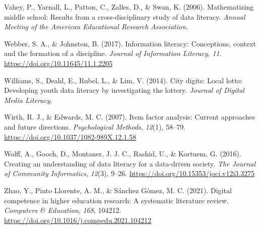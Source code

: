 \documentclass[
  12pt,
  a4paper,
  twoside]{article}
\newlength{\cslhangindent}
\newenvironment{CSLReferences}[2] %
 {\begin{list}{}{%
  \setlength{\itemindent}{0pt}
  \setlength{\leftmargin}{0pt}
  \setlength{\parsep}{0pt}
  \ifodd #1
   \setlength{\leftmargin}{\cslhangindent}
   \setlength{\itemindent}{-1\cslhangindent}
  \fi
  \setlength{\itemsep}{#2\baselineskip}}}
 {\end{list}}
\begin{document}
\begin{CSLReferences}{1}{0}
Vahey, P., Yarnall, L., Patton, C., Zalles, D., \& Swan, K. (2006). Mathematizing middle school: Results from a cross-disciplinary study of data literacy. \emph{Annual Meeting of the American Educational Research Association}.

Webber, S. A., \& Johnston, B. (2017). Information literacy: Conceptions, context and the formation of a discipline. \emph{Journal of Information Literacy}, \emph{11}. \url{https://doi.org/10.11645/11.1.2205}

Williams, S., Deahl, E., Rubel, L., \& Lim, V. (2014). City digits: Local lotto: Developing youth data literacy by investigating the lottery. \emph{Journal of Digital Media Literacy}.

Wirth, R. J., \& Edwards, M. C. (2007). Item factor analysis: Current approaches and future directions. \emph{Psychological Methods}, \emph{12}(1), 58--79. \url{https://doi.org/10.1037/1082-989X.12.1.58}

Wolff, A., Gooch, D., Montaner, J. J. C., Rashid, U., \& Kortuem, G. (2016). Creating an understanding of data literacy for a data-driven society. \emph{The Journal of Community Informatics}, \emph{12}(3), 9--26. \url{https://doi.org/10.15353/joci.v12i3.3275}

Zhao, Y., Pinto Llorente, A. M., \& Sánchez Gómez, M. C. (2021). Digital competence in higher education research: A systematic literature review. \emph{Computers \& Education}, \emph{168}, 104212. \url{https://doi.org/10.1016/j.compedu.2021.104212}

\end{CSLReferences}
\end{document}
